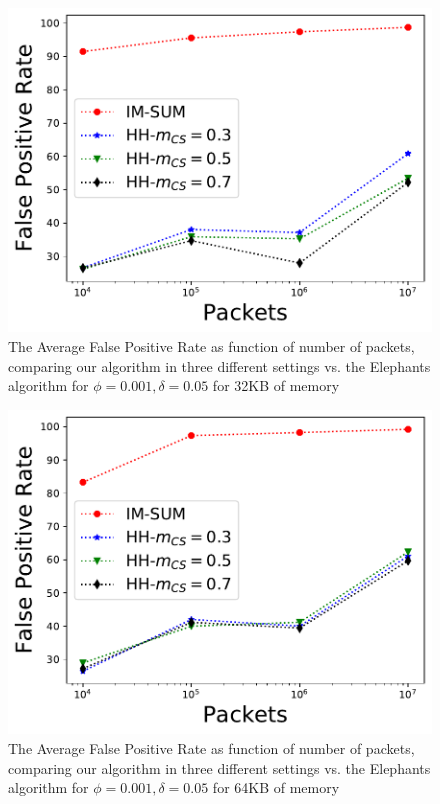 \begin{figure} \centering
    \includegraphics[width=\linewidth]{HH/figures/FPR_per_pkts_m=0.03125.pdf}
    \caption[Average False Positive for 32KB of memory]{The Average False Positive Rate as function of number of packets, comparing our algorithm in three different settings vs. the Elephants algorithm for $\phi=0.001,\delta=0.05$ for 32KB of memory}
    \label{fig:fig3_a}    
\end{figure}
\begin{figure} \centering
    \includegraphics[width=\linewidth]{HH/figures/FPR_per_pkts_m=0.0625.pdf}
    \caption[Average False Positive for 64KB of memory]{The Average False Positive Rate as function of number of packets, comparing our algorithm in three different settings vs. the Elephants algorithm for $\phi=0.001,\delta=0.05$ for 64KB of memory}
    \label{fig:fig3_b}
\end{figure}
